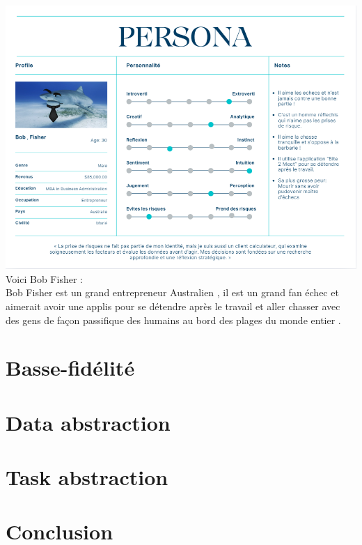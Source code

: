 \documentclass{article}
\begin{document}
\includegraphics[width=1\textwidth]{photo/Persona_Nizar.png}\\

Voici Bob Fisher :\\

Bob Fisher est un grand entrepreneur Australien , il est un grand fan échec et aimerait avoir une applis
pour se détendre après le travail et aller chasser avec des gens de façon passifique des humains au bord 
des plages du monde entier . 



\section{Basse-fidélité}

\section{Data abstraction}

\section{Task abstraction}


\section{Conclusion}
\end{document}
